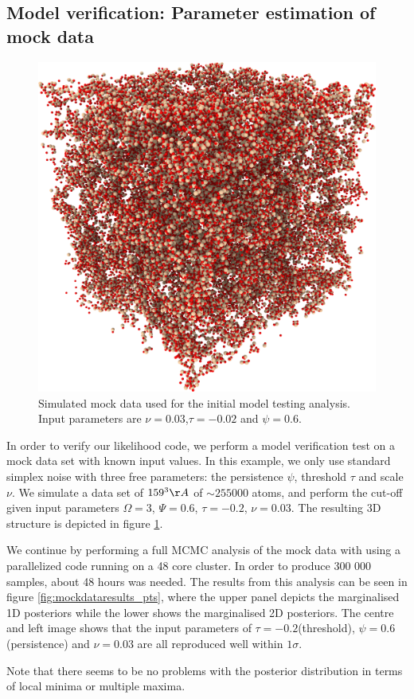 \documentclass[aps,pre,twocolumn,letterpaper,floatfix,showpacs]{revtex4}
\begin{document}
\subsection{Model verification: Parameter estimation of mock data}
\begin{figure}[htb!]
\includegraphics[width=.45\textwidth]{model_test.png}
\caption{Simulated mock data used for the initial model testing analysis. Input parameters are $\nu=0.03$,$\tau=-0.02$ and $\psi=0.6$.}
\label{fig:mockdata}
\end{figure}
In order to verify our likelihood code, we perform a model verification test on a mock data set with known input values. In this example, we only use standard simplex noise with three free parameters: the persistence $\psi$, threshold $\tau$ and scale $\nu$. We simulate a data set of $159 ^3 \AA$ of $\sim 255 000$ atoms, and perform the cut-off given input parameters $\Omega=3$, $\Psi = 0.6$, $\tau=-0.2$, $\nu=0.03$. The resulting 3D structure is depicted in figure \ref{fig:mockdata}. 

We continue by performing a full MCMC analysis of the mock data with using a parallelized code running on a 48 core cluster. In order to produce 300 000 samples, about 48 hours was needed. The results from this analysis can be seen in figure \ref{fig:mockdataresults_pts}, where the upper panel depicts the marginalised 1D posteriors while the lower shows the marginalised 2D posteriors. The centre and left image shows that the input parameters of $\tau=-0.2$(threshold), $\psi=0.6$(persistence) and $\nu=0.03$ are all reproduced well within $1 \sigma$.

Note that there seems to be no problems with the posterior distribution in terms of local minima or multiple maxima. 
\end{document}
